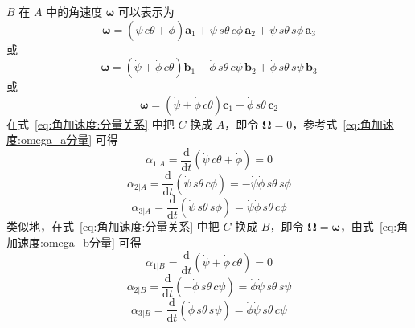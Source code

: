 \begin{example}
    $B$ 在 $A$ 中的角速度 $\bm{\omega}$ 可以表示为
    \begin{equation}
        \bm{\omega} = (\dot{\psi}\,c\theta+\dot{\phi})\mathbf{a}_1 + \dot{\psi}\,s\theta\,c\phi\,\mathbf{a}_2 + \dot{\psi}\,s\theta\,s\phi\,\mathbf{a}_3
        \label{eq:角加速度:omega_a分量}
    \end{equation}
    或
    \begin{equation}
        \bm{\omega} = (\dot{\psi}+\dot{\phi}\,c\theta)\mathbf{b}_1 - \dot{\phi}\,s\theta\,c\psi\,\mathbf{b}_2 + \dot{\phi}\,s\theta\,s\psi\,\mathbf{b}_3
        \label{eq:角加速度:omega_b分量}
    \end{equation}
    或
    \begin{equation}
        \bm{\omega} = (\dot{\psi}+\dot{\phi}\,c\theta)\mathbf{c}_1 - \dot{\phi}\,s\theta\,\mathbf{c}_2
        \label{eq:角加速度:omega_c分量}
    \end{equation}
    在式~\eqref{eq:角加速度:分量关系} 中把 $C$ 换成 $A$，即令 $\bm{\Omega}=0$，参考式~\eqref{eq:角加速度:omega_a分量} 可得
    \begin{equation}
        \alpha_{1|A} = \frac{\mathrm{d}}{\mathrm{d}t}(\dot{\psi}\,c\theta+\dot{\phi}) = 0
    \end{equation}
    \begin{equation}
        \alpha_{2|A} = \frac{\mathrm{d}}{\mathrm{d}t}(\dot{\psi}\,s\theta\,c\phi) = -\dot{\psi}\dot{\phi}\,s\theta\,s\phi
    \end{equation}
    \begin{equation}
        \alpha_{3|A} = \frac{\mathrm{d}}{\mathrm{d}t}(\dot{\psi}\,s\theta\,s\phi) = \dot{\psi}\dot{\phi}\,s\theta\,c\phi
    \end{equation}
    类似地，在式~\eqref{eq:角加速度:分量关系} 中把 $C$ 换成 $B$，即令 $\bm{\Omega}=\bm{\omega}$，由式~\eqref{eq:角加速度:omega_b分量} 可得
    \begin{equation}
        \alpha_{1|B} = \frac{\mathrm{d}}{\mathrm{d}t}(\dot{\psi}+\dot{\phi}\,c\theta) = 0
    \end{equation}
    \begin{equation}
        \alpha_{2|B} = \frac{\mathrm{d}}{\mathrm{d}t}(-\dot{\phi}\,s\theta\,c\psi) = \dot{\phi}\dot{\psi}\,s\theta\,s\psi
    \end{equation}
    \begin{equation}
        \alpha_{3|B} = \frac{\mathrm{d}}{\mathrm{d}t}(\dot{\phi}\,s\theta\,s\psi) = \dot{\phi}\dot{\psi}\,s\theta\,c\psi
    \end{equation}

\end{example}
